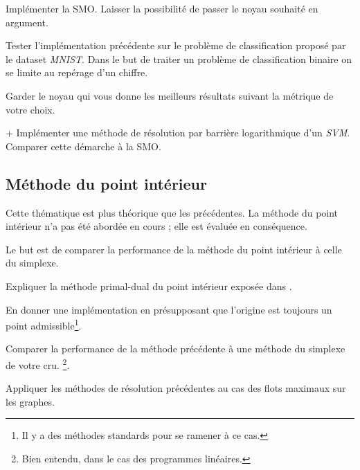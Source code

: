 \documentclass[11pt, a4paper]{article}
\begin{document}
\begin{question}
  Implémenter la SMO. Laisser la possibilité de passer le noyau
  souhaité en argument.
\end{question}

\begin{question}
  Tester l'implémentation précédente sur le problème de classification
  proposé par le dataset \emph{MNIST}. Dans le but de traiter un
  problème de classification binaire on se limite au repérage d'un
  chiffre.

  \noindent Garder le noyau qui vous donne les meilleurs résultats
  suivant la métrique de votre choix.
\end{question}

\begin{question}{+}
  Implémenter une méthode de résolution par barrière logarithmique
  d'un \emph{SVM}. Comparer cette démarche à la SMO.
\end{question}

\subsection{Méthode du point intérieur}

Cette thématique est plus théorique que les précédentes. La méthode du
point intérieur n'a pas été abordée en cours ; elle est évaluée en
conséquence.

Le but est de comparer la performance de la méthode du point intérieur
à celle du simplexe.

\begin{question}
  Expliquer la méthode primal-dual du point intérieur exposée
  dans \cite[11.7]{Boyd:2004:CO:993483}.
\end{question}

\begin{question}
  En donner une implémentation en présupposant que l'origine est
  toujours un point admissible\footnote{Il y a des méthodes standards
    pour se ramener à ce cas.}.
\end{question}

\begin{question}
  Comparer la performance de la méthode précédente à une méthode du
  simplexe de votre cru. \footnote{Bien entendu, dans le cas des
    programmes linéaires.}.
\end{question}

\begin{question}
  Appliquer les méthodes de résolution précédentes au cas des flots
  maximaux sur les graphes.
\end{question}



\end{document}
